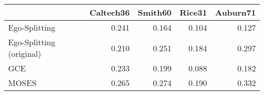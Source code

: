 \begin{tabular}{lrrrr}
\toprule
{} & Caltech36 & Smith60 & Rice31 & Auburn71 \\
\midrule
Ego-Splitting            &     0.241 &   0.164 &  0.104 &    0.127 \\
Ego-Splitting (original) &     0.210 &   0.251 &  0.184 &    0.297 \\
GCE                      &     0.233 &   0.199 &  0.088 &    0.182 \\
MOSES                    &     0.265 &   0.274 &  0.190 &    0.332 \\
\bottomrule
\end{tabular}
